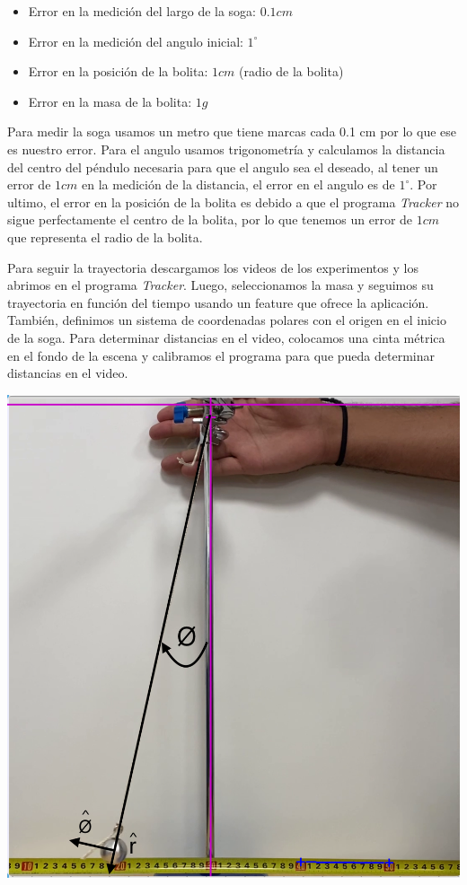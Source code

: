\documentclass[12pt,a4]{article}
\begin{document}
\begin{itemize}
    \item Error en la medición del largo de la soga: $0.1 cm$
    \item Error en la medición del angulo inicial: $1^\circ$
    \item Error en la posición de la bolita: $1 cm$ (radio de la bolita)
    \item Error en la masa de la bolita: $1 g$
\end{itemize}

Para medir la soga usamos un metro que tiene marcas cada 0.1 cm por lo que ese es nuestro error. Para el angulo usamos trigonometría y calculamos la distancia del centro del péndulo necesaria para que el angulo sea el deseado, al tener un error de $1 cm$ en la medición de la distancia, el error en el angulo es de $1^\circ$. Por ultimo, el error en la posición de la bolita es debido a que el programa \textit{Tracker} no sigue perfectamente el centro de la bolita, por lo que tenemos un error de $1 cm$ que representa el radio de la bolita.

\begin{minipage}{0.5\textwidth}
    Para seguir la trayectoria descargamos los videos de los experimentos y los abrimos en el programa \textit{Tracker}. Luego, seleccionamos la masa y seguimos su trayectoria en función del tiempo usando un feature que ofrece la aplicación. También, definimos un sistema de coordenadas polares con el origen en el inicio de la soga. Para determinar distancias en el video, colocamos una cinta métrica en el fondo de la escena y calibramos el programa para que pueda determinar distancias en el video. 
\end{minipage}
\begin{minipage}{0.5\textwidth}
    \centering
    \includegraphics[width=0.8\linewidth]{tracker.png}
\end{minipage}
\end{document}
